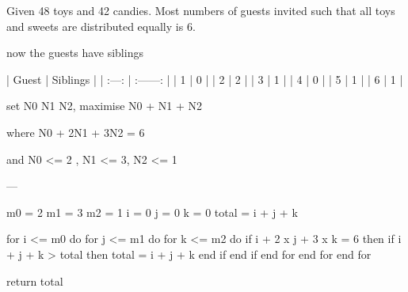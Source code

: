Given 48 toys and 42 candies. Most numbers of guests invited such that all toys and sweets are distributed equally is 6.

  now the guests have siblings

  | Guest | Siblings |
  | :---: | :------: |
  |   1   |    0     |
  |   2   |    2     |
  |   3   |    1     |
  |   4   |    0     |
  |   5   |    1     |
  |   6   |    1     |

  set N0 N1 N2, maximise N0 + N1 + N2

  where N0 + 2N1 + 3N2 = 6

  and N0 <= 2 , N1 <= 3, N2 <= 1

---

m0 = 2
m1 = 3
m2 = 1
i = 0
j = 0
k = 0
total = i + j + k

for i <= m0 do
  for j <= m1 do
    for k <= m2 do
      if i + 2 x j + 3 x k = 6 then
        if i + j + k > total then
          total = i + j + k
        end if
      end if
    end for
  end for
end for

return total
